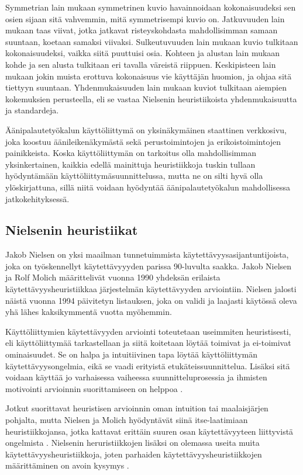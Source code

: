 \documentclass[utf8]{gradu3}
\begin{document}
Symmetrian lain mukaan symmetrinen kuvio havainnoidaan kokonaisuudeksi sen osien sijaan sitä vahvemmin, mitä symmetrisempi kuvio on. Jatkuvuuden lain mukaan taas viivat, jotka jatkavat risteyskohdasta mahdollisimman samaan suuntaan, koetaan samaksi viivaksi. Sulkeutuvuuden lain mukaan kuvio tulkitaan kokonaisuudeksi, vaikka siitä puuttuisi osia. Kohteen ja alustan lain mukaan kohde ja sen alusta tulkitaan eri tavalla väreistä riippuen. Keskipisteen lain mukaan jokin muista erottuva kokonaisuus vie käyttäjän huomion, ja ohjaa sitä tiettyyn suuntaan. Yhdenmukaisuuden lain mukaan kuviot tulkitaan aiempien kokemuksien perusteella, eli se vastaa Nielsenin heuristiikoista yhdenmukaisuutta ja standardeja. 

Äänipalautetyökalun käyttöliittymä on yksinäkymäinen staattinen verkkosivu, joka koostuu  äänileikenäkymästä sekä perustoimintojen ja erikoistoimintojen painikkeista. Koska käyttöliittymän on tarkoitus olla mahdollisimman yksinkertainen, kaikkia edellä mainittuja heuristiikkoja tuskin tullaan hyödyntämään käyttöliittymäsuunnittelussa, mutta ne on silti hyvä olla ylöskirjattuna, sillä niitä voidaan hyödyntää äänipalautetyökalun mahdollisessa jatkokehityksessä. 

\subsection{Nielsenin heuristiikat}

Jakob Nielsen on yksi maailman tunnetuimmista käytettävyysasijantuntijoista, joka on työskennellyt käytettävyyyden parissa 90-luvulta saakka. Jakob Nielsen ja Rolf Molich \parencite[][]{improving-human} määrittelivät vuonna 1990 yhdeksän erilaista käytettävyysheuristiikkaa järjestelmän käytettävyyden arviointiin. Nielsen \parencite[][]{enhancing} jalosti näistä vuonna 1994 päivitetyn listauksen, joka on validi ja laajasti käytössä oleva yhä lähes kaksikymmentä vuotta myöhemmin. 

Käyttöliittymien käytettävyyden arviointi toteutetaan useimmiten heuristisesti, eli käyttöliittymää tarkastellaan ja siitä koitetaan löytää toimivat ja ei-toimivat ominaisuudet. Se on halpa ja intuitiivinen tapa löytää käyttöliittymän käytettävyysongelmia, eikä se vaadi erityistä etukäteissuunnittelua. Lisäksi sitä voidaan käyttää jo varhaisessa vaiheessa suunnitteluprosessia ja ihmisten motivointi arvioinnin suorittamiseen on helppoa \parencite[][]{heuristic-evaluation}.

Jotkut suorittavat heuristisen arvioinnin oman intuition tai maalaisjärjen pohjalta, mutta Nielsen ja Molich hyödyntävät siinä itse-laatimiaan heuristiikkojansa, jotka kattavat erittäin suuren osan käytettävyyteen liittyvistä ongelmista \parencite[][]{heuristic-evaluation}. Nielsenin heruristiikkojen lisäksi on olemassa useita muita käytettävyysheuristiikkoja, joten parhaiden käytettävyysheuristiikkojen määrittäminen on avoin kysymys \parencite[][]{enhancing}. 
\end{document}
